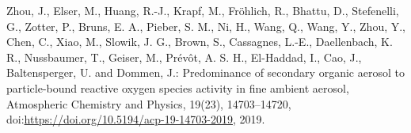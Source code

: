 \documentclass[
]{article}
\begin{document}
Zhou, J., Elser, M., Huang, R.-J., Krapf, M., Fröhlich, R., Bhattu, D.,
Stefenelli, G., Zotter, P., Bruns, E. A., Pieber, S. M., Ni, H., Wang,
Q., Wang, Y., Zhou, Y., Chen, C., Xiao, M., Slowik, J. G., Brown, S.,
Cassagnes, L.-E., Daellenbach, K. R., Nussbaumer, T., Geiser, M.,
Prévôt, A. S. H., El-Haddad, I., Cao, J., Baltensperger, U. and Dommen,
J.: Predominance of secondary organic aerosol to particle-bound reactive
oxygen species activity in fine ambient aerosol, Atmospheric Chemistry
and Physics, 19(23), 14703--14720,
doi:\href{https://doi.org/https://doi.org/10.5194/acp-19-14703-2019}{https://doi.org/10.5194/acp-19-14703-2019},
2019.
\end{document}
